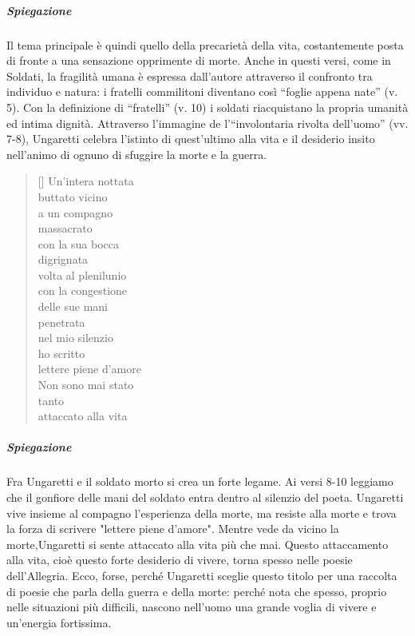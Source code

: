 \documentclass[10pt]{report}
\begin{document}
		\subparagraph[Fratelli]{Spiegazione}Il tema principale è quindi quello della precarietà della vita, costantemente posta di fronte a una sensazione opprimente di morte. Anche in questi versi, come in Soldati, la fragilità umana è espressa dall'autore attraverso il confronto tra individuo e natura: i fratelli commilitoni diventano così “foglie appena nate” (v. 5). Con la definizione di “fratelli” (v. 10) i soldati riacquistano la propria umanità ed intima dignità. Attraverso l'immagine de l'“involontaria rivolta dell'uomo” (vv. 7-8), Ungaretti celebra l'istinto di quest'ultimo alla vita e il desiderio insito nell'animo di ognuno di sfuggire la morte e la guerra.
		
		\newpage
		\renewcommand{\poemtoc}{subsection}
		\settowidth{\versewidth}{There was an old party of Lyme}
		
		\begin{verse}[\versewidth]
			Un'intera nottata \\
			buttato vicino \\
			a un compagno \\
			massacrato \\
			con la sua bocca \\
			digrignata \\
			volta al plenilunio \\
			con la congestione \\
			delle sue mani \\
			penetrata \\
			nel mio silenzio \\
			ho scritto \\
			lettere piene d'amore \\
			
			Non sono mai stato \\
			tanto \\
			attaccato alla vita\\
		\end{verse}
		
		\subparagraph[Veglia]{Spiegazione}Fra Ungaretti e il soldato morto
		si crea un forte legame. Ai versi 8-10 leggiamo che il	gonfiore delle mani del soldato entra dentro al silenzio del
		poeta. Ungaretti vive insieme al compagno l’esperienza della morte, ma resiste alla morte e trova la forza di scrivere
		"lettere piene d’amore". Mentre vede da vicino la morte,Ungaretti si sente attaccato alla vita più che mai. Questo
		attaccamento alla vita, cioè questo forte desiderio di vivere, torna spesso nelle poesie dell’Allegria. Ecco, forse,
		perché Ungaretti sceglie questo titolo per una raccolta di poesie che parla della guerra e della morte: perché nota
		che spesso, proprio nelle situazioni più difficili, nascono nell’uomo una grande voglia di vivere e un’energia fortissima.
		
\end{document}
